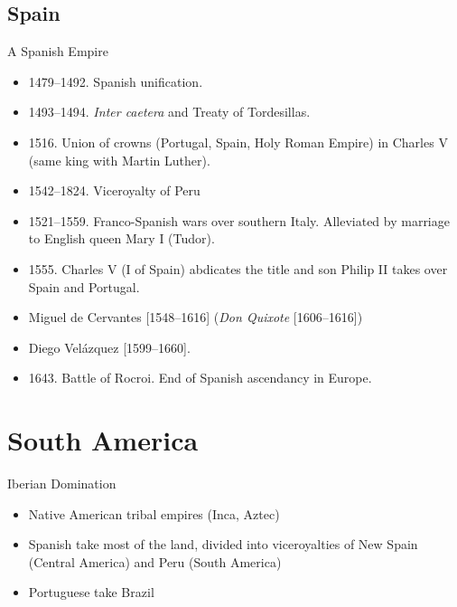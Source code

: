 \subsection{Spain}
\begin{frame}{A Spanish Empire}

	\begin{itemize}
		\item<1-2,4-8,10-12>1479--1492. Spanish unification.
		\item<2-2,4-8,10-12>1493--1494. \emph{Inter caetera} and Treaty of Tordesillas.
		\item<4-8,10-12>1516. Union of crowns (Portugal, Spain, Holy Roman Empire) in Charles V (same king with Martin Luther).
		\item<1-17>1542--1824. Viceroyalty of Peru
		\item<5-8,10-12>1521--1559. Franco-Spanish wars over southern Italy. Alleviated by marriage to English queen Mary I (Tudor).
		\item<6-8,10-12>1555. Charles V (I of Spain) abdicates the title and son Philip II takes over Spain and Portugal.
		\item<7-8,10-12>Miguel de Cervantes [1548--1616] (\emph{Don Quixote} [1606--1616])
		\item<8-8,10-12>Diego Vel\'{a}zquez [1599--1660].
		\item<10-12>1643. Battle of Rocroi. End of Spanish ascendancy in Europe.
	\end{itemize}
\end{frame}

\section{South America}
\begin{frame}{Iberian Domination}
	\begin{itemize}
		\item<1->Native American tribal empires (Inca, Aztec)
		\item<2->Spanish take most of the land, divided into viceroyalties of New Spain (Central America) and Peru (South America)
		\item<3->Portuguese take Brazil
	\end{itemize}
\end{frame}

